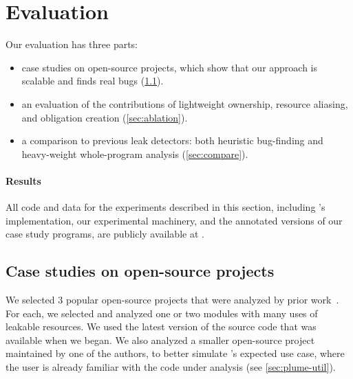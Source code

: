 \section{Evaluation}
\label{sec:evaluation}


Our evaluation has three parts:
\begin{itemize}
\item case studies on open-source projects, which show that our approach
  is scalable and finds real bugs (\cref{sec:case-studies}).
\item an evaluation of the contributions of
  lightweight ownership, %
  resource aliasing, %
  and obligation creation %
  (\cref{sec:ablation}).
\item a comparison to previous leak detectors:  both heuristic bug-finding
  and heavy-weight whole-program
  analysis (\cref{sec:compare}).
\end{itemize}
\noindent
\paragraph{Results} All code and data for the experiments described
in this section, including \tool's implementation, our experimental
machinery, and the annotated versions of our case study programs,
are publicly available at .

\subsection{Case studies on open-source projects}
\label{sec:case-studies}

We selected 3 popular open-source projects that were analyzed by prior work~\cite{zuo2019grapple}.
For each, we selected and analyzed one or two modules
with many uses of leakable resources. We used
the latest version of the source code that was available
when we began. We also analyzed a smaller open-source project
maintained by one of the authors, to better simulate \tool's
expected use case, where the user is already familiar with the
code under analysis (see \cref{sec:plume-util}).

